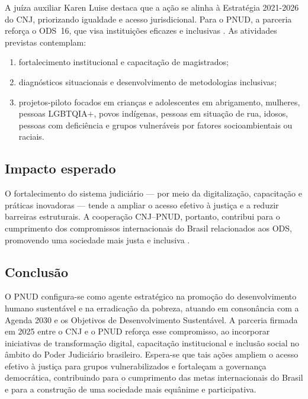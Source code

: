 \begin{description}
A juíza auxiliar Karen Luise destaca que a ação se alinha à Estratégia 2021-2026
do CNJ, priorizando igualdade e acesso jurisdicional. Para o PNUD, a parceria
reforça o ODS~16, que visa instituições eficazes e inclusivas
\cite{undp2025pnudcnj}. As atividades previstas contemplam:
\begin{enumerate}
  \item fortalecimento institucional e capacitação de magistrados;
  \item diagnósticos situacionais e desenvolvimento de metodologias inclusivas;
  \item projetos-piloto focados em crianças e adolescentes em abrigamento,
        mulheres, pessoas LGBTQIA$+$, povos indígenas, pessoas em situação de
        rua, idosos, pessoas com deficiência e grupos vulneráveis por fatores
        socioambientais ou raciais.
\end{enumerate}

\subsection*{Impacto esperado}
O fortalecimento do sistema judiciário — por meio da digitalização,
capacitação e práticas inovadoras — tende a ampliar o acesso efetivo à justiça e
a reduzir barreiras estruturais. A cooperação CNJ–PNUD, portanto, contribui para
o cumprimento dos compromissos internacionais do Brasil relacionados aos ODS,
promovendo uma sociedade mais justa e inclusiva
\cite{undp2025pnudcnj}.

\subsection{Conclusão}
O PNUD configura-se como agente estratégico na promoção do desenvolvimento humano sustentável e na erradicação da pobreza, atuando em consonância com a Agenda 2030 e os Objetivos de Desenvolvimento Sustentável. A parceria firmada em 2025 entre o CNJ e o PNUD reforça esse compromisso, ao incorporar iniciativas de transformação digital, capacitação institucional e inclusão social no âmbito do Poder Judiciário brasileiro. Espera-se que tais ações ampliem o acesso efetivo à justiça para grupos vulnerabilizados e fortaleçam a governança democrática, contribuindo para o cumprimento das metas internacionais do Brasil e para a construção de uma sociedade mais equânime e participativa.





\end{description}
